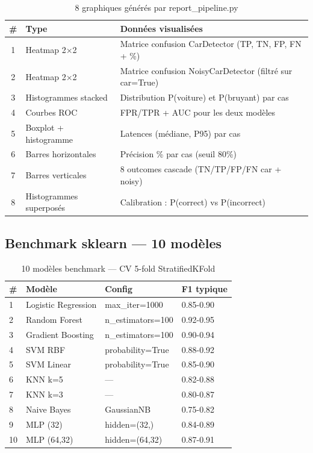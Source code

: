 \documentclass[11pt,a4paper]{article}
\begin{document}
\begin{table}[htbp]
\centering
\begin{tabular}{@{}clp{9cm}@{}}
\toprule
\textbf{\#} & \textbf{Type} & \textbf{Données visualisées} \\
\midrule
1 & Heatmap 2$\times$2 & Matrice confusion CarDetector (TP, TN, FP, FN + \%) \\
2 & Heatmap 2$\times$2 & Matrice confusion NoisyCarDetector (filtré sur car=True) \\
3 & Histogrammes stacked & Distribution P(voiture) et P(bruyant) par cas \\
4 & Courbes ROC & FPR/TPR + AUC pour les deux modèles \\
5 & Boxplot + histogramme & Latences (médiane, P95) par cas \\
6 & Barres horizontales & Précision \% par cas (seuil 80\%) \\
7 & Barres verticales & 8 outcomes cascade (TN/TP/FP/FN car + noisy) \\
8 & Histogrammes superposés & Calibration : P(correct) vs P(incorrect) \\
\bottomrule
\end{tabular}
\caption{8 graphiques générés par report\_pipeline.py}
\end{table}

\subsection{Benchmark sklearn — 10 modèles}

\begin{table}[htbp]
\centering
\begin{tabular}{@{}llll@{}}
\toprule
\textbf{\#} & \textbf{Modèle} & \textbf{Config} & \textbf{F1 typique} \\
\midrule
1 & Logistic Regression & max\_iter=1000 & 0.85-0.90 \\
2 & Random Forest & n\_estimators=100 & 0.92-0.95 \\
3 & Gradient Boosting & n\_estimators=100 & 0.90-0.94 \\
4 & SVM RBF & probability=True & 0.88-0.92 \\
5 & SVM Linear & probability=True & 0.85-0.90 \\
6 & KNN k=5 & — & 0.82-0.88 \\
7 & KNN k=3 & — & 0.80-0.87 \\
8 & Naive Bayes & GaussianNB & 0.75-0.82 \\
9 & MLP (32) & hidden=(32,) & 0.84-0.89 \\
10 & MLP (64,32) & hidden=(64,32) & 0.87-0.91 \\
\bottomrule
\end{tabular}
\caption{10 modèles benchmark — CV 5-fold StratifiedKFold}
\end{table}
\end{document}
